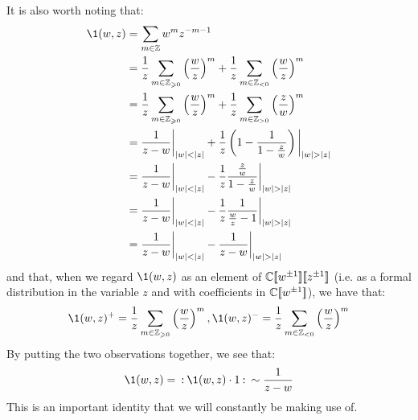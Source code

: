        \begin{remark}
            It is also worth noting that:
                $$
                    \begin{aligned}
                        \1(w, z) & = \sum_{m \in \Z} w^m z^{-m - 1}
                        \\
                        & = \frac1z \sum_{m \in \Z_{\geq 0}} \left(\frac{w}{z}\right)^m + \frac1z \sum_{m \in \Z_{< 0}} \left(\frac{w}{z}\right)^m
                        \\
                        & = \frac1z \sum_{m \in \Z_{\geq 0}} \left(\frac{w}{z}\right)^m + \frac1z \sum_{m \in \Z_{> 0}} \left(\frac{z}{w}\right)^m
                        \\
                        & = \frac{1}{z - w}\bigg|_{|w| < |z|} + \frac1z\left( 1 - \frac{1}{1 - \frac{z}{w}} \right)\bigg|_{|w| > |z|}
                        \\
                        & = \frac{1}{z - w}\bigg|_{|w| < |z|} - \frac1z \frac{\frac{z}{w}}{1 - \frac{z}{w}}\bigg|_{|w| > |z|}
                        \\
                        & = \frac{1}{z - w}\bigg|_{|w| < |z|} - \frac1z \frac{1}{\frac{w}{z} - 1}\bigg|_{|w| > |z|}
                        \\
                        & = \frac{1}{z - w}\bigg|_{|w| < |z|} - \frac{1}{z - w}\bigg|_{|w| > |z|}
                    \end{aligned}
                $$
            and that, when we regard $\1(w, z)$ as an element of $\mathbb{C}[\![w^{\pm 1}]\!][\![z^{\pm 1}]\!]$ (i.e. as a formal distribution in the variable $z$ and with coefficients in $\mathbb{C}[\![w^{\pm 1}]\!]$), we have that:
                $$\1(w, z)^+ = \frac1z \sum_{m \in \Z_{\geq 0}} \left(\frac{w}{z}\right)^m, \1(w, z)^- = \frac1z \sum_{m \in \Z_{< 0}} \left(\frac{w}{z}\right)^m$$
            By putting the two observations together, we see that:
                $$\1(w, z) = \order{ \1(w, z) \cdot 1 } \sim \frac{1}{z - w}$$
            This is an important identity that we will constantly be making use of.
        \end{remark}
        
